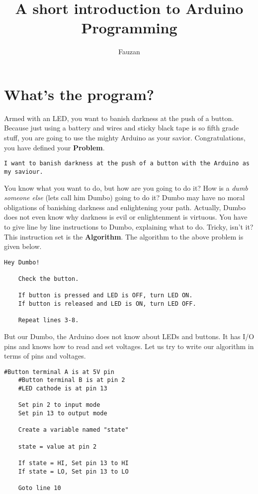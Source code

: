 \documentclass{article}
\title{A short introduction to Arduino Programming}
\author{Fauzan}
\begin{document}
\newcommand{\inlncd}[1]{\colorbox{lgray}{\texttt{#1}}}
\maketitle

\tableofcontents

\newpage

\section{What's the program?}
	Armed with an LED, you want to banish darkness at the push of a button\@. Because just using a battery and wires and sticky black tape is so fifth grade stuff, you are going to use the mighty Arduino as your savior. Congratulations, you have defined your \textbf{Problem}.

	\begin{lstlisting}[gobble=4]
	I want to banish darkness at the push of a button with the Arduino as my saviour.
	\end{lstlisting}

	You know what you want to do, but how are you going to do it? How is a \textit{dumb someone else} (lets call him Dumbo) going to do it? Dumbo may have no moral obligations of banishing darkness and enlightening your path. Actually, Dumbo does not even know why darkness is evil or enlightenment is virtuous. You have to give line by line instructions to Dumbo, explaining what to do. Tricky, isn't it? This instruction set is the \textbf{Algorithm}. The algorithm to the above problem is given below.

	\begin{lstlisting}[gobble=4]
	Hey Dumbo!

	Check the button.

	If button is pressed and LED is OFF, turn LED ON.
	If button is released and LED is ON, turn LED OFF.

	Repeat lines 3-8.
	\end{lstlisting}

	But our Dumbo, the Arduino does not know about LEDs and buttons. It has I/O pins and knows how to read and set voltages. Let us try to write our algorithm in terms of pins and voltages.

	\begin{lstlisting}[gobble=4]
	#Button terminal A is at 5V pin
	#Button terminal B is at pin 2
	#LED cathode is at pin 13

	Set pin 2 to input mode
	Set pin 13 to output mode

	Create a variable named "state"

	state = value at pin 2

	If state = HI, Set pin 13 to HI
	If state = LO, Set pin 13 to LO

	Goto line 10
	\end{lstlisting}
\end{document}
